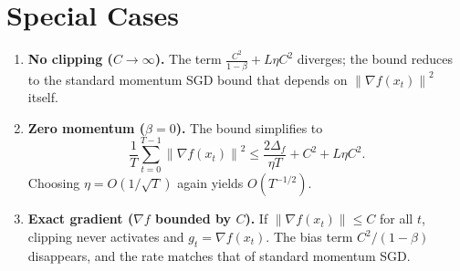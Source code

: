 \documentclass{article}
\newcommand{\norm}[1]{\left\lVert #1\right\rVert}
\newcommand{\grad}{\nabla}
\begin{document}
\section*{Special Cases}
\begin{enumerate}
\item \textbf{No clipping ($C\to\infty$).}  The term $\frac{C^2}{1-\beta}+L\eta C^2$ diverges; the bound reduces to the standard momentum SGD bound that depends on $\norm{\grad f(x_t)}^2$ itself.
\item \textbf{Zero momentum ($\beta=0$).}  The bound simplifies to
\[
\frac{1}{T}\sum_{t=0}^{T-1}\norm{\grad f(x_t)}^2
\le \frac{2\Delta_f}{\eta T}+ C^2 + L\eta C^2 .
\]
Choosing $\eta = O(1/\sqrt{T})$ again yields $O(T^{-1/2})$.
\item \textbf{Exact gradient ($\grad f$ bounded by $C$).}  If $\norm{\grad f(x_t)}\le C$ for all $t$, clipping never activates and $g_t=\grad f(x_t)$. The bias term $C^2/(1-\beta)$ disappears, and the rate matches that of standard momentum SGD.
\end{enumerate}
\end{document}

